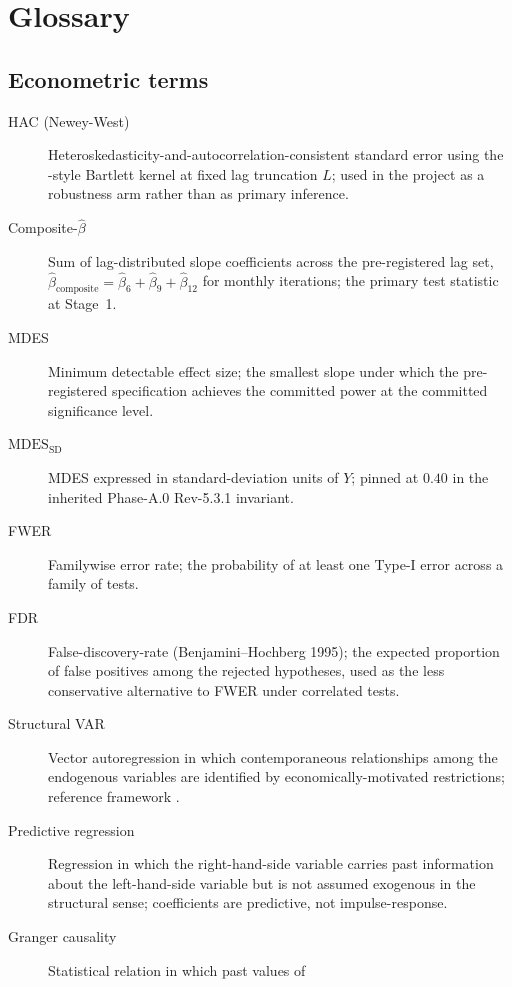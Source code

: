 \section{Glossary}\label{app:A}

\subsection*{Econometric terms}
\begin{description}
  \item[HAC (Newey-West)] Heteroskedasticity-and-autocorrelation-consistent
    standard error using the \citet{hansen_2022}-style Bartlett kernel at
    fixed lag truncation \(L\); used in the project as a robustness arm
    rather than as primary inference.
  \item[Composite-\(\hat{\beta}\)] Sum of lag-distributed slope
    coefficients across the pre-registered lag set,
    \(\hat{\beta}_{\mathrm{composite}} = \hat{\beta}_{6} + \hat{\beta}_{9}
    + \hat{\beta}_{12}\) for monthly iterations; the primary test
    statistic at Stage~1.
  \item[MDES] Minimum detectable effect size; the smallest slope under
    which the pre-registered specification achieves the committed power
    at the committed significance level.
  \item[\(\mathrm{MDES}_{\mathrm{SD}}\)] MDES expressed in
    standard-deviation units of \(Y\); pinned at \(0.40\) in the
    inherited Phase-A.0 Rev-5.3.1 invariant.
  \item[FWER] Familywise error rate; the probability of at least one
    Type-I error across a family of tests.
  \item[FDR] False-discovery-rate (Benjamini--Hochberg 1995); the expected
    proportion of false positives among the rejected hypotheses, used as
    the less conservative alternative to FWER under correlated tests.
  \item[Structural VAR] Vector autoregression in which contemporaneous
    relationships among the endogenous variables are identified by
    economically-motivated restrictions; reference framework
    \citet{kilian_lutkepohl_2017}.
  \item[Predictive regression] Regression in which the right-hand-side
    variable carries past information about the left-hand-side variable
    but is not assumed exogenous in the structural sense; coefficients
    are predictive, not impulse-response.
  \item[Granger causality] Statistical relation in which past values of

\end{description}
